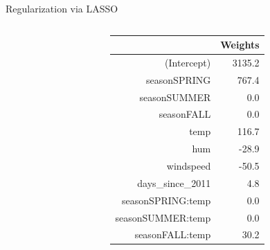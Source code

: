 \documentclass[11pt,compress,t,notes=noshow, aspectratio=169, xcolor=table]{beamer}
\begin{document}
\begin{frame}{Regularization via LASSO }
\begin{columns}[c, totalwidth=\linewidth]
\begin{column}{0.65\textwidth}
\end{column}
\begin{column}{0.35\textwidth}

\scriptsize
\centering
\begin{tabular}{rr}
  \hline
 & Weights \\ 
  \hline
(Intercept) & 3135.2 \\ 
  seasonSPRING & 767.4 \\ 
  seasonSUMMER & 0.0 \\ 
  seasonFALL & 0.0 \\ 
  temp & 116.7 \\ 
  hum & -28.9 \\ 
  windspeed & -50.5 \\ 
  days\_since\_2011 & 4.8 \\ 
  \hline
  seasonSPRING:temp & 0.0 \\ 
  seasonSUMMER:temp & 0.0 \\ 
  seasonFALL:temp & 30.2 \\ 
   \hline
\end{tabular}
\end{column}
\end{columns}




\end{frame}
\endlecture
\end{document}
